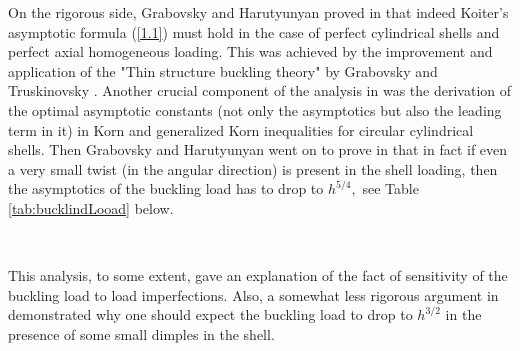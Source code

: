 On the rigorous side, Grabovsky and Harutyunyan proved in \cite{bib:Gra.Har.3} that indeed Koiter's asymptotic formula (\ref{1.1}) must hold in the case of perfect cylindrical shells and perfect axial homogeneous loading. This was achieved by the improvement and application of the "Thin structure buckling theory" by Grabovsky and Truskinovsky \cite{bib:Gra.Tru.}. Another crucial component of the analysis in \cite{bib:Gra.Har.3} was the derivation of the optimal asymptotic constants (not only the asymptotics but also the leading term in it) in Korn and generalized Korn inequalities for circular cylindrical shells. Then Grabovsky and Harutyunyan went on to prove in \cite{bib:Gra.Har.2} that in fact if even a very small twist (in the angular direction) is present in the shell loading, then the asymptotics of the buckling load has to drop to $h^{5/4},$ see Table \ref{tab:bucklindLooad} below.

\begin{table}[h]
\centering
{}\\
\caption{The dependence of the critical buckling load of circular cylindrical shells on the type of loading. Vertical load versus vertical load with a small twist.}
\label{tab:bucklindLooad}
\end{table}
This analysis, to some extent, gave an explanation of the fact of sensitivity of the buckling load to load imperfections. Also, a somewhat less rigorous argument in \cite{bib:Gra.Har.2} demonstrated why one should expect the buckling load to drop to $h^{3/2}$ in the presence of some small dimples in the shell. 

